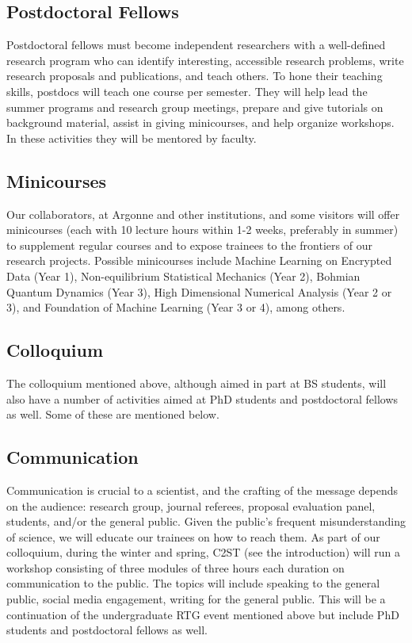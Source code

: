 \documentclass[11pt]{NSFamsart}
\begin{document}
\subsection*{Postdoctoral Fellows}
Postdoctoral fellows must become independent researchers with a well-defined research program who can identify interesting, accessible research problems, write research proposals and publications, and teach others.  To hone their teaching skills, postdocs will teach one course per semester. They will help lead the summer programs and research group meetings, prepare and give tutorials on background material, assist in giving minicourses, and help organize workshops.  In these activities they will be mentored by faculty.

\subsection*{Minicourses}
Our collaborators, at Argonne and other institutions, and some visitors will offer minicourses (each with 10 lecture hours within 1-2 weeks, preferably in summer) to supplement regular courses and to expose trainees to the frontiers of our research projects. Possible minicourses include  Machine Learning on Encrypted Data (Year 1),  Non-equilibrium Statistical Mechanics (Year 2),   Bohmian Quantum Dynamics (Year 3), High Dimensional Numerical Analysis (Year 2 or 3), and Foundation of Machine Learning (Year 3 or 4), among others. 

\subsection*{Colloquium} The colloquium mentioned above, although aimed in part at BS students, will also have a number of activities aimed at PhD students and postdoctoral fellows as well.  Some of these are mentioned below.

\subsection*{Communication}
Communication is crucial to a scientist, and the crafting of the message depends on the audience:  research group, journal referees, proposal evaluation panel, students, and/or the general public.  Given the public's frequent misunderstanding of science, we will educate our trainees on how to reach them.  As part of our colloquium, during the winter and spring, C2ST (see the introduction) will run a workshop consisting of three modules of three hours each duration on communication to the public.  The topics will include speaking to the general public, social media engagement, writing for the general public.  This will be a continuation of the undergraduate RTG event mentioned above but include PhD students and postdoctoral fellows as well.
\end{document}

